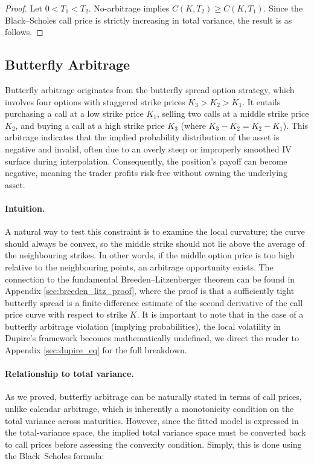 \documentclass[12pt,oneside]{report}
\theoremstyle{definition}
\theoremstyle{remark}
\begin{document}
\begin{proof}
Let \(0<T_1<T_2\). No-arbitrage implies \(C(K,T_2)\ge C(K,T_1)\). Since the Black--Scholes call price is strictly increasing in total variance, the result is as follows.
\end{proof}

\subsection{Butterfly Arbitrage}
\label{subsubsec:butterfly-arbitrage}

Butterfly arbitrage originates from the butterfly spread option strategy, which involves four options with staggered strike prices $K_3 > K_2 > K_1$. It entails purchasing a call at a low strike price $K_1$, selling two calls at a middle strike price $K_2$, and buying a call at a high strike price $K_3$ (where $K_3 - K_2 = K_2 - K_1$). This arbitrage indicates that the implied probability distribution of the asset is negative and invalid, often due to an overly steep or improperly smoothed IV surface during interpolation. Consequently, the position's payoff can become negative, meaning the trader profits risk-free without owning the underlying asset.

\paragraph{Intuition.}
A natural way to test this constraint is to examine the local curvature; the curve should always be convex, so the middle strike should not lie above the average of the neighbouring strikes. In other words, if the middle option price is too high relative to the neighbouring points, an arbitrage opportunity exists. The connection to the fundamental Breeden--Litzenberger theorem can be found in Appendix \ref{sec:breeden_litz_proof}, where the proof is that a sufficiently tight butterfly spread is a finite-difference estimate of the second derivative of the call price curve with respect to strike $K$. It is important to note that in the case of a butterfly arbitrage violation (implying probabilities), the local volatility in Dupire's framework becomes mathematically undefined, we direct the reader to Appendix \ref{sec:dupire_eq} for the full breakdown.

\paragraph{Relationship to total variance.}
As we proved, butterfly arbitrage can be naturally stated in terms of call prices, unlike calendar arbitrage, which is inherently a monotonicity condition on the total variance across maturities. However, since the fitted model is expressed in the total-variance space, the implied total variance space must be converted back to call prices before assessing the convexity condition. Simply, this is done using the Black--Scholes formula:
\end{document}
